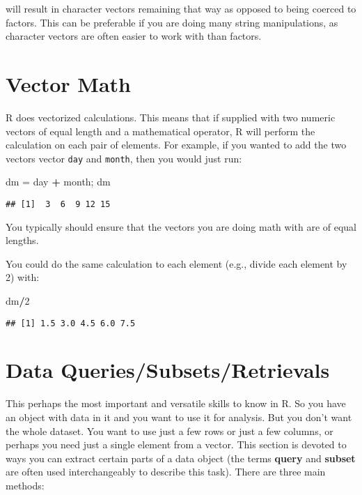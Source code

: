 \documentclass[]{book}
\newenvironment{Shaded}{\begin{snugshade}}{\end{snugshade}}
\newcommand{\DecValTok}[1]{\textcolor[rgb]{0.00,0.00,0.81}{#1}}
\newcommand{\StringTok}[1]{\textcolor[rgb]{0.31,0.60,0.02}{#1}}
\newcommand{\OperatorTok}[1]{\textcolor[rgb]{0.81,0.36,0.00}{\textbf{#1}}}
\newcommand{\NormalTok}[1]{#1}
\theoremstyle{definition}
\theoremstyle{definition}
\theoremstyle{definition}
\theoremstyle{remark}
\begin{document}
will result in character vectors remaining that way as opposed to being
coerced to factors. This can be preferable if you are doing many string
manipulations, as character vectors are often easier to work with than
factors.

\section{Vector Math}\label{vector-math}

R does vectorized calculations. This means that if supplied with two
numeric vectors of equal length and a mathematical operator, R will
perform the calculation on each pair of elements. For example, if you
wanted to add the two vectors vector \texttt{day} and \texttt{month},
then you would just run:

\begin{Shaded}
\begin{Highlighting}[]
\NormalTok{dm =}\StringTok{ }\NormalTok{day }\OperatorTok{+}\StringTok{ }\NormalTok{month; dm}
\end{Highlighting}
\end{Shaded}

\begin{verbatim}
## [1]  3  6  9 12 15
\end{verbatim}

You typically should ensure that the vectors you are doing math with are
of equal lengths.

You could do the same calculation to each element (e.g., divide each
element by 2) with:

\begin{Shaded}
\begin{Highlighting}[]
\NormalTok{dm}\OperatorTok{/}\DecValTok{2}
\end{Highlighting}
\end{Shaded}

\begin{verbatim}
## [1] 1.5 3.0 4.5 6.0 7.5
\end{verbatim}

\section{Data Queries/Subsets/Retrievals}\label{sub}

This perhaps the most important and versatile skills to know in R. So
you have an object with data in it and you want to use it for analysis.
But you don't want the whole dataset. You want to use just a few rows or
just a few columns, or perhaps you need just a single element from a
vector. This section is devoted to ways you can extract certain parts of
a data object (the terms \textbf{query} and \textbf{subset} are often
used interchangeably to describe this task). There are three main
methods:
\end{document}
